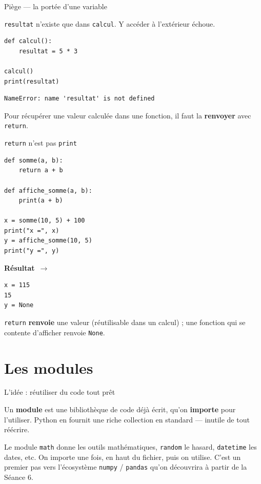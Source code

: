 \documentclass[aspectratio=169,11pt]{beamer}
\newcommand{\resultat}{{\scriptsize\textbf{R\'esultat}~$\rightarrow$}\par\vspace{1pt}}
\begin{document}
\begin{frame}[fragile]{Piège — la portée d'une variable}
\begin{ucadpiege}
{\small \texttt{resultat} n'existe que dans \texttt{calcul}. Y accéder à l'extérieur échoue.}
\end{ucadpiege}
\begin{lstlisting}
def calcul():
    resultat = 5 * 3

calcul()
print(resultat)
\end{lstlisting}
\begin{lstlisting}[style=err]
NameError: name 'resultat' is not defined
\end{lstlisting}
{\small Pour récupérer une valeur calculée dans une fonction, il faut la \textbf{renvoyer} avec \texttt{return}.}
\end{frame}

\begin{frame}[fragile]{\texttt{return} n'est pas \texttt{print}}
\begin{lstlisting}
def somme(a, b):
    return a + b

def affiche_somme(a, b):
    print(a + b)

x = somme(10, 5) + 100
print("x =", x)
y = affiche_somme(10, 5)
print("y =", y)
\end{lstlisting}
\resultat
\begin{lstlisting}[style=out]
x = 115
15
y = None
\end{lstlisting}
{\small \texttt{return} \textbf{renvoie} une valeur (réutilisable dans un calcul) ; une fonction qui se contente d'afficher renvoie \texttt{None}.}
\end{frame}

\section{Les modules}

\begin{frame}{L'idée : réutiliser du code tout prêt}
\begin{ucaddef}
{\small Un \textbf{module} est une bibliothèque de code déjà écrit, qu'on \textbf{importe} pour l'utiliser. Python en fournit une riche collection en standard — inutile de tout réécrire.}
\end{ucaddef}
{\small Le module \texttt{math} donne les outils mathématiques, \texttt{random} le hasard, \texttt{datetime} les dates, etc. On importe une fois, en haut du fichier, puis on utilise. C'est un premier pas vers l'écosystème \texttt{numpy} / \texttt{pandas} qu'on découvrira à partir de la Séance 6.}
\end{frame}
\end{document}
